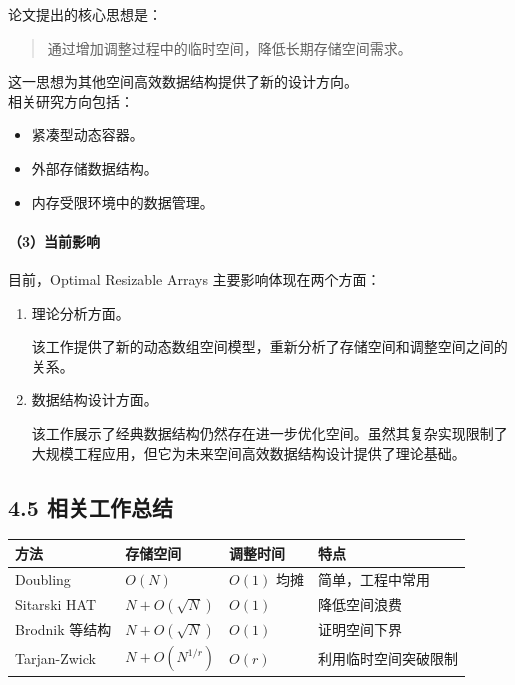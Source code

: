 \documentclass[
  UTF8,
  a4paper,
  12pt]{ctexart}
\newcounter{none} %
\begin{document}
论文提出的核心思想是：

\begin{quote}
通过增加调整过程中的临时空间，降低长期存储空间需求。
\end{quote}

这一思想为其他空间高效数据结构提供了新的设计方向。\\
相关研究方向包括：

\begin{itemize}
\item
  紧凑型动态容器。
\item
  外部存储数据结构。
\item
  内存受限环境中的数据管理。
\end{itemize}

\paragraph{（3）当前影响}\label{ux5f53ux524dux5f71ux54cd}

目前，Optimal Resizable Arrays 主要影响体现在两个方面：

\begin{enumerate}
\def\labelenumi{\arabic{enumi}.}
\item
  理论分析方面。

  该工作提供了新的动态数组空间模型，重新分析了存储空间和调整空间之间的关系。
\item
  数据结构设计方面。

  该工作展示了经典数据结构仍然存在进一步优化空间。虽然其复杂实现限制了大规模工程应用，但它为未来空间高效数据结构设计提供了理论基础。
\end{enumerate}

\subsection{4.5
相关工作总结}\label{ux76f8ux5173ux5de5ux4f5cux603bux7ed3}

{\def\LTcaptype{none} %
\begin{longtable}[]{@{}llll@{}}
\toprule\noalign{}
方法 & 存储空间 & 调整时间 & 特点 \\
\midrule\noalign{}
\endhead
\bottomrule\noalign{}
\endlastfoot
Doubling & \(O(N)\) & \(O(1)\) 均摊 & 简单，工程中常用 \\
Sitarski HAT & \(N+O(\sqrt{N})\) & \(O(1)\) & 降低空间浪费 \\
Brodnik 等结构 & \(N+O(\sqrt{N})\) & \(O(1)\) & 证明空间下界 \\
Tarjan-Zwick & \(N+O(N^{1/r})\) & \(O(r)\) & 利用临时空间突破限制 \\
\end{longtable}
}
\end{document}
